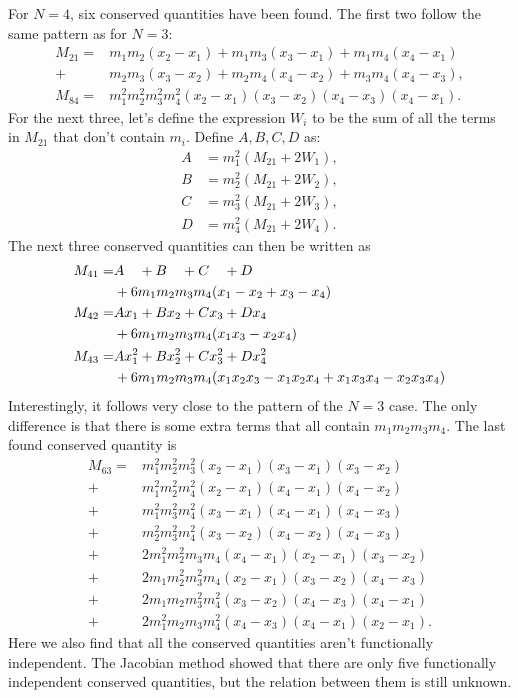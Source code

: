 \documentclass[english,master]{liumaiex}
\theoremstyle{plain}
\theoremstyle{definition}
\begin{document}
For $N = 4$, six conserved quantities have been found. The first two follow the same pattern as for $N = 3$:
\begin{align}
	M_{21} = &m_1 m_2 (x_2 - x_1) + m_1 m_3 (x_3 - x_1) + m_1 m_4 (x_4 - x_1) \\ +  &m_2 m_3 (x_3 - x_2) + m_2 m_4 (x_4 - x_2) + m_3 m_4 (x_4 - x_3),\\
	M_{84} = &m_1^2m_2^2m_3^2m_4^2(x_2 - x_1)(x_3 - x_2)(x_4 - x_3)(x_4 - x_1).
\end{align}
For the next three, let's define the expression $W_i$ to be the sum of all the terms in $M_{21}$ that don't contain $m_i$. Define $A, B, C, D$ as:
\begin{align}
	A &= m_1^2(M_{21} + 2W_1), \\
	B &= m_2^2(M_{21} + 2W_2), \\
	C &= m_3^2(M_{21} + 2W_3), \\
	D &= m_4^2(M_{21} + 2W_4).
\end{align}
The next  three conserved quantities can then be written as
\begin{align}
	M_{41} =& A\phantom{x_1} + B\phantom{x_2} + C\phantom{x_3} + D\phantom{x_4} \notag \\
	&+ 6m_1m_2m_3m_4 (x_1 - x_2 + x_3 - x_4) \\
	M_{42} =& Ax_1 + Bx_2 + Cx_3 + Dx_4 \notag \\
	&+ 6m_1m_2m_3m_4 (x_1x_3 - x_2x_4) \\
	M_{43} =& Ax_1^2 + Bx_2^2 + Cx_3^2 + Dx_4^2 \notag \\
	&+ 6m_1m_2m_3m_4 (x_1x_2x_3 - x_1x_2x_4 + x_1x_3x_4 - x_2x_3x_4)
\end{align}
%
Interestingly, it follows very close to the pattern of the $N = 3$ case. The only difference is that there is some extra terms that all contain $m_1m_2m_3m_4$. The last found conserved quantity is
\begin{equation}
\begin{aligned}
	M_{63} =
		 &m_1^2m_2^2m_3^2(x_2 - x_1)(x_3 - x_1)(x_3 - x_2) \\
		+&m_1^2m_2^2m_4^2(x_2 - x_1)(x_4 - x_1)(x_4 - x_2) \\
		+&m_1^2m_3^2m_4^2(x_3 - x_1)(x_4 - x_1)(x_4 - x_3) \\
		+&m_2^2m_3^2m_4^2(x_3 - x_2)(x_4 - x_2)(x_4 - x_3) \\
		+&2m_1^2m_2^2m_3m_4(x_4 - x_1)(x_2 - x_1)(x_3 - x_2) \\
		+&2m_1m_2^2m_3^2m_4(x_2 - x_1)(x_3 - x_2)(x_4 - x_3) \\
		+&2m_1m_2m_3^2m_4^2(x_3 - x_2)(x_4 - x_3)(x_4 - x_1) \\
		+&2m_1^2m_2m_3m_4^2(x_4 - x_3)(x_4 - x_1)(x_2 - x_1).
\end{aligned}
\end{equation}
Here we also find that all the conserved quantities aren't functionally independent. The Jacobian method showed that there are only five functionally independent conserved quantities, but the relation between them is still unknown.
\end{document}
